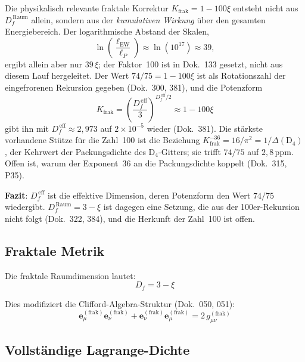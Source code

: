 Die physikalisch relevante fraktale Korrektur $K_{\text{frak}} = 1 - 100\xi$
entsteht nicht aus $D_f^{\,\text{Raum}}$ allein, sondern aus der
\emph{kumulativen Wirkung} über den gesamten Energiebereich. Der
logarithmische Abstand der Skalen,
\begin{equation}
    \ln\!\left(\frac{\ell_{\text{EW}}}{\ell_P}\right)
    \approx \ln\!\left(10^{17}\right)
    \approx 39 ,
\end{equation}
ergibt allein aber nur $39\,\xi$; der Faktor~100 ist in Dok.~133 gesetzt,
nicht aus diesem Lauf hergeleitet. Der Wert $74/75 = 1-100\xi$ ist als
Rotationszahl der eingefrorenen Rekursion gegeben (Dok.~300, 381), und
die Potenzform
\begin{equation}
    K_{\text{frak}} = \left(\frac{D_f^{\,\text{eff}}}{3}\right)^{\!D_f^{\,\text{eff}}/2}
    \approx 1 - 100\xi
\end{equation}
gibt ihn mit $D_f^{\,\text{eff}} \approx 2{,}973$ auf $2\times10^{-5}$ wieder
(Dok.~381). Die stärkste vorhandene Stütze für die Zahl~100 ist die
Beziehung $K_{\text{frak}}^{-36} = 16/\pi^2 = 1/\Delta(\mathrm{D}_4)$, der
Kehrwert der Packungsdichte des $\mathrm{D}_4$-Gitters; sie trifft $74/75$
auf $2{,}8$\,ppm. Offen ist, warum der Exponent~36 an die Packungsdichte
koppelt (Dok.~315, P35).

\textbf{Fazit}: $D_f^{\,\text{eff}}$ ist die effektive Dimension, deren
Potenzform den Wert $74/75$ wiedergibt. $D_f^{\,\text{Raum}} = 3 - \xi$ ist
dagegen eine Setzung, die aus der 100er-Rekursion nicht folgt
(Dok.~322, 384), und die Herkunft der Zahl~100 ist offen.

\subsection{Fraktale Metrik}

Die fraktale Raumdimension lautet:
\begin{equation}
    D_f = 3 - \xi
\end{equation}

Dies modifiziert die Clifford-Algebra-Struktur (Dok.~050, 051):
\begin{equation}
    \mathbf{e}_\mu^{(\mathrm{frak})} \mathbf{e}_\nu^{(\mathrm{frak})}
    + \mathbf{e}_\nu^{(\mathrm{frak})} \mathbf{e}_\mu^{(\mathrm{frak})}
    = 2\, g_{\mu\nu}^{(\mathrm{frak})}
\end{equation}

\subsection{Vollständige Lagrange-Dichte}

